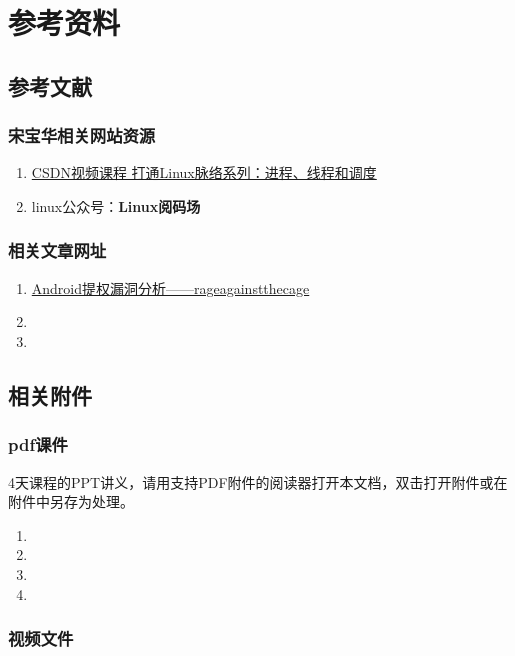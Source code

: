 

\partabstractfp{}
\part{参考资料}
\chapter{参考文献}
\section{宋宝华相关网站资源}
\begin{enumerate}
  \item \href{https://edu.csdn.net/course/detail/5995}{CSDN视频课程 打通Linux脉络系列：进程、线程和调度}
  \item linux公众号：\textbf{Linux阅码场}
\end{enumerate}

\section{相关文章网址}
\begin{enumerate}
  \item \href{https://blog.csdn.net/feglass/article/details/46403501}{Android提权漏洞分析——rageagainstthecage}
  \item 
  \item 
\end{enumerate}

\chapter{相关附件}
\section{pdf课件}
4天课程的PPT讲义，请用支持PDF附件的阅读器打开本文档，双击打开附件或在附件中另存为处理。
\begin{enumerate}
  \item {}
  \item {}
  \item {}
  \item {}
\end{enumerate}



\section{视频文件}
\ifattachpdffile

\else
\videowarn
\fi
